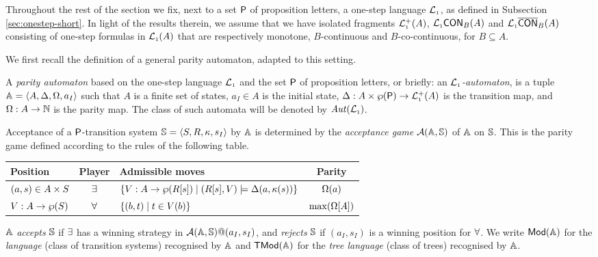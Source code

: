 

Throughout the rest of the section we fix, next to a set $\mathsf{P}$ of proposition 
letters, a one-step language $\mathcal{L}_{\scriptscriptstyle 1}$, as defined in Subsection \ref{sec:onestep-short}.
In light of the results therein, we assume that we have isolated fragments $\mathcal{L}_{\scriptscriptstyle 1}^+(A)$, $\mathcal{L}_{\scriptscriptstyle 1}\mathsf{CON}_{B}(A)$ and $\mathcal{L}_{\scriptscriptstyle 1}\overline{\mathsf{CON}}_{B}(A)$ consisting of one-step formulas in $\mathcal{L}_{\scriptscriptstyle 1}(A)$ that are respectively monotone, $B$-continuous and $B$-co-continuous, for $B \subseteq A$.

We first recall the definition of a general parity automaton, adapted to this
setting. 

\begin{definition} \label{def:partityaut}
A \emph{parity automaton} based on the one-step language $\mathcal{L}_{\scriptscriptstyle 1}$ and the set
$\mathsf{P}$ of proposition letters, or briefly: an \emph{$\mathcal{L}_{\scriptscriptstyle 1}$-automaton}, is a 
tuple $\mathbb{A} = \langle{A,\Delta,\Omega,a_I}\rangle$ such that $A$ is a finite set of states,
$a_I \in A$ is the initial state, $\Delta: A\times \wp(\mathsf{P}) \to \mathcal{L}_{\scriptscriptstyle 1}^+(A)$
is the transition map, and $\Omega: A \to \mathbb{N}$ is the parity map.
The class of such automata will be denoted by $\mathit{Aut}(\mathcal{L}_{\scriptscriptstyle 1})$.

Acceptance of a $\mathsf{P}$-transition system $\mathbb{S} = 
\langle{S,R,\kappa,s_I}\rangle$ by $\mathbb{A}$ is determined by the \emph{acceptance 
game} $\mathcal{A}(\mathbb{A},\mathbb{S})$ of $\mathbb{A}$ on $\mathbb{S}$. 
This is the parity game defined according to the rules of the following table.
\begin{center}
\small
\begin{tabular}{|l|c|l|c|} \hline
Position & Player & Admissible moves & Parity \\
\hline
    $(a,s) \in A \times S$
  & $\exists$
  & $\{V : A \to \wp(R[s]) \mid (R[s],V) \models \Delta (a, \kappa(s)) \}$
  & $\Omega(a)$ 
\\
    $V : A \rightarrow \wp(S)$
  & $\forall$
  & $\{(b,t) \mid t \in V(b)\}$
  & $\max(\Omega[A])$
\\ \hline
 \end{tabular}
\end{center}
%
$\mathbb{A}$ \emph{accepts} $\mathbb{S}$ if $\exists$ has a winning strategy in 
$\mathcal{A}(\mathbb{A},\mathbb{S})@(a_I,s_I)$, and \emph{rejects} $\mathbb{S}$ if $(a_I,s_I)$ is 
a winning position for $\forall$. 
We write $\mathsf{Mod}(\mathbb{A})$ for the \emph{language} (class of transition systems) 
recognised by $\mathbb{A}$ and $\mathsf{TMod}(\mathbb{A})$ for the \emph{tree language} (class of 
trees) recognised by $\mathbb{A}$.
\end{definition}

